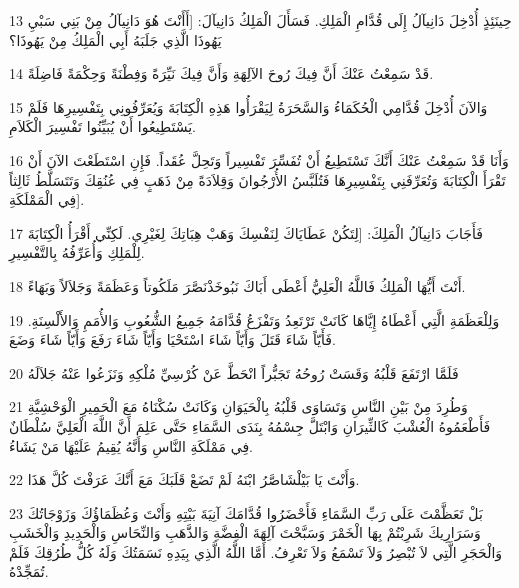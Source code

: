 \par 13 حِينَئِذٍ أُدْخِلَ دَانِيآلُ إِلَى قُدَّامِ الْمَلِكِ. فَسَأَلَ الْمَلِكُ دَانِيآلَ: [أَأَنْتَ هُوَ دَانِيآلُ مِنْ بَنِي سَبْيِ يَهُوذَا الَّذِي جَلَبَهُ أَبِي الْمَلِكُ مِنْ يَهُوذَا؟
\par 14 قَدْ سَمِعْتُ عَنْكَ أَنَّ فِيكَ رُوحَ الآلِهَةِ وَأَنَّ فِيكَ نَيِّرَةً وَفِطْنَةً وَحِكْمَةً فَاضِلَةً.
\par 15 وَالآنَ أُدْخِلَ قُدَّامِي الْحُكَمَاءُ وَالسَّحَرَةُ لِيَقْرَأُوا هَذِهِ الْكِتَابَةَ وَيُعَرِّفُونِي بِتَفْسِيرِهَا فَلَمْ يَسْتَطِيعُوا أَنْ يُبَيِّنُوا تَفْسِيرَ الْكَلاَمِ.
\par 16 وَأَنَا قَدْ سَمِعْتُ عَنْكَ أَنَّكَ تَسْتَطِيعُ أَنْ تُفَسِّرَ تَفْسِيراً وَتَحِلَّ عُقَداً. فَإِنِ اسْتَطَعْتَ الآنَ أَنْ تَقْرَأَ الْكِتَابَةَ وَتُعَرِّفَنِي بِتَفْسِيرِهَا فَتُلَبَّسُ الأُرْجُوانَ وَقِلاَدَةً مِنْ ذَهَبٍ فِي عُنُقِكَ وَتَتَسَلَّطُ ثَالِثاً فِي الْمَمْلَكَةِ].
\par 17 فَأَجَابَ دَانِيآلُ الْمَلِكَ: [لِتَكُنْ عَطَايَاكَ لِنَفْسِكَ وَهَبْ هِبَاتِكَ لِغَيْرِي. لَكِنِّي أَقْرَأُ الْكِتَابَةَ لِلْمَلِكِ وَأُعَرِّفُهُ بِالتَّفْسِيرِ.
\par 18 أَنْتَ أَيُّهَا الْمَلِكُ فَاللَّهُ الْعَلِيُّ أَعْطَى أَبَاكَ نَبُوخَذْنَصَّرَ مَلَكُوتاً وَعَظَمَةً وَجَلاَلاً وَبَهَاءً.
\par 19 وَلِلْعَظَمَةِ الَّتِي أَعْطَاهُ إِيَّاهَا كَانَتْ تَرْتَعِدُ وَتَفْزَعُ قُدَّامَهُ جَمِيعُ الشُّعُوبِ وَالأُمَمِ وَالأَلْسِنَةِ. فَأَيّاً شَاءَ قَتَلَ وَأَيّاً شَاءَ اسْتَحْيَا وَأَيّاً شَاءَ رَفَعَ وَأَيّاً شَاءَ وَضَعَ.
\par 20 فَلَمَّا ارْتَفَعَ قَلْبُهُ وَقَسَتْ رُوحُهُ تَجَبُّراً انْحَطَّ عَنْ كُرْسِيِّ مُلْكِهِ وَنَزَعُوا عَنْهُ جَلاَلَهُ
\par 21 وَطُرِدَ مِنْ بَيْنِ النَّاسِ وَتَسَاوَى قَلْبُهُ بِالْحَيَوَانِ وَكَانَتْ سُكْنَاهُ مَعَ الْحَمِيرِ الْوَحْشِيَّةِ فَأَطْعَمُوهُ الْعُشْبَ كَالثِّيرَانِ وَابْتَلَّ جِسْمُهُ بِنَدَى السَّمَاءِ حَتَّى عَلِمَ أَنَّ اللَّهَ الْعَلِيَّ سُلْطَانٌ فِي مَمْلَكَةِ النَّاسِ وَأَنَّهُ يُقِيمُ عَلَيْهَا مَنْ يَشَاءُ.
\par 22 وَأَنْتَ يَا بَيْلْشَاصَّرُ ابْنَهُ لَمْ تَضَعْ قَلَبَكَ مَعَ أَنَّكَ عَرَفْتَ كُلَّ هَذَا.
\par 23 بَلْ تَعَظَّمْتَ عَلَى رَبِّ السَّمَاءِ فَأَحْضَرُوا قُدَّامَكَ آنِيَةَ بَيْتِهِ وَأَنْتَ وَعُظَمَاؤُكَ وَزَوْجَاتُكَ وَسَرَارِيكَ شَرِبْتُمْ بِهَا الْخَمْرَ وَسَبَّحْتَ آلِهَةَ الْفِضَّةِ وَالذَّهَبِ وَالنِّحَاسِ وَالْحَدِيدِ وَالْخَشَبِ وَالْحَجَرِ الَّتِي لاَ تُبْصِرُ وَلاَ تَسْمَعُ وَلاَ تَعْرِفُ. أَمَّا اللَّهُ الَّذِي بِيَدِهِ نَسَمَتُكَ وَلَهُ كُلُّ طُرُقِكَ فَلَمْ تُمَجِّدْهُ.
